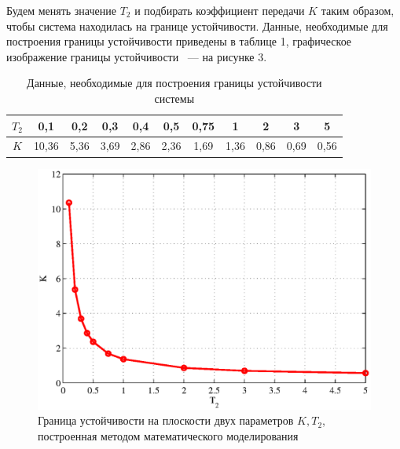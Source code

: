 \documentclass[a4paper,12pt]{article} %
\begin{document}
Будем менять значение $T_2$ и подбирать коэффициент передачи $K$ таким образом, чтобы система находилась на границе устойчивости. Данные, необходимые для построения границы устойчивости приведены в таблице 1, графическое изображение границы устойчивости ~--- на рисунке 3.
\begin{table}[h!]
	\caption{Данные, необходимые для построения границы устойчивости системы}
	\renewcommand{\arraystretch}{1.8} %
	\begin{center}
		\begin{tabular}{|c|c|c|c|c|c|c|c|c|c|c|}
			\hline $T_2$ & 0,1 & 0,2 & 0,3 & 0,4 & 0,5 & 0,75 & 1 & 2 & 3 & 5\\
			\hline $K$ & 10,36 & 5,36 & 3,69 & 2,86 & 2,36 & 1,69 & 1,36 & 0,86 & 0,69 & 0,56\\
			\hline
		\end{tabular}	
	\end{center}	
\end{table} 
\begin{figure}[h!]
	\centering
	\includegraphics[width=1\linewidth]{scheme/plot0.eps}
	\caption{Граница устойчивости на плоскости двух параметров $K, T_2$, построенная методом математического моделирования}
\end{figure}
\end{document}
